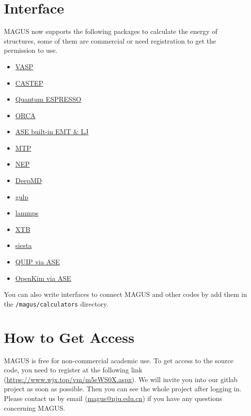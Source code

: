 \documentclass[12pt,oneside]{book}
\newcommand{\file}[1]{\texttt{#1}}
\begin{document}
\section{Interface}
MAGUS now supports the following packages to calculate the energy of structures, some of them are commercial or need registration to get the permission to use.
\begin{itemize}
    \item \href{https://www.vasp.at/}{VASP}
    \item \href{http://www.castep.org/}{CASTEP}
    \item \href{https://www.quantum-espresso.org/}{Quantum ESPRESSO}
    \item \href{https://orcaforum.kofo.mpg.de/app.php/portal}{ORCA}
    \item \href{https://wiki.fysik.dtu.dk/ase/ase/calculators/calculators.html#module-ase.calculators}{ASE built-in EMT \& LJ}
    \item \href{https://mlip.skoltech.ru/}{MTP}
    \item \href{https://gpumd.zheyongfan.org/index.php/Main_Page}{NEP}
    \item \href{https://docs.deepmodeling.com/projects/deepmd/en/master/index.html}{DeepMD}
    \item \href{https://gulp.curtin.edu.au/gulp/}{gulp}
    \item \href{https://www.lammps.org/}{lammps}
    \item \href{https://xtb-docs.readthedocs.io/en/latest/contents.html}{XTB}
    \item \href{https://siesta-project.org/siesta/}{siesta}
    \item \href{https://libatoms.github.io/QUIP/}{QUIP via ASE}
    \item \href{https://openkim.org/}{OpenKim via ASE}
\end{itemize}
You can also write interfaces to connect MAGUS and other codes by add them in the \file{/magus/calculators} directory.

\section{How to Get Access}
MAGUS is free for non-commercial academic use. To get access to the source code, you need to register at the following link (\url{https://www.wjx.top/vm/m5eWS0X.aspx}). We will invite you into our gitlab project as soon as possible. Then you can see the whole project after logging in. Please contact us by email (\href{mailto:magus@nju.edu.cn}{magus@nju.edu.cn}) if you have any questions concerning MAGUS.
\end{document}

